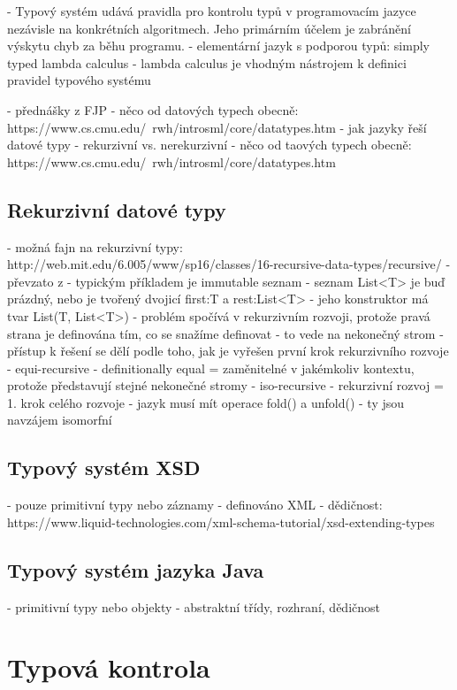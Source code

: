 \documentclass[czech,DP]{thesiskiv}
\begin{document}
- Typový systém udává pravidla pro kontrolu typů v programovacím jazyce nezávisle na konkrétních algoritmech. Jeho primárním účelem je zabránění výskytu chyb za běhu programu\cite{cardelli2004}.
- elementární jazyk s podporou typů: simply typed lambda calculus
- lambda calculus je vhodným nástrojem k definici pravidel typového systému

- přednášky z FJP
- něco od datových typech obecně: https://www.cs.cmu.edu/~rwh/introsml/core/datatypes.htm
- jak jazyky řeší datové typy
	- rekurzivní vs. nerekurzivní
- něco od taových typech obecně: https://www.cs.cmu.edu/~rwh/introsml/core/datatypes.htm

\subsection{Rekurzivní datové typy}

- možná fajn na rekurzivní typy: http://web.mit.edu/6.005/www/sp16/classes/16-recursive-data-types/recursive/
- převzato z \cite{pierce2002}
- typickým příkladem je immutable seznam
	- seznam List<T> je buď prázdný, nebo je tvořený dvojicí first:T a rest:List<T>
	- jeho konstruktor má tvar List(T, List<T>)
- problém spočívá v rekurzivním rozvoji, protože pravá strana je definována tím, co se snažíme definovat
- to vede na nekonečný strom
- přístup k řešení se dělí podle toho, jak je vyřešen první krok rekurzivního rozvoje
	- equi-recursive
		- definitionally equal = zaměnitelné v jakémkoliv kontextu, protože představují stejné nekonečné stromy
	- iso-recursive
		- rekurzivní rozvoj = 1. krok celého rozvoje
		- jazyk musí mít operace fold() a unfold()
		- ty jsou navzájem isomorfní

\subsection{Typový systém XSD}

 - pouze primitivní typy nebo záznamy
 - definováno XML
 - dědičnost: https://www.liquid-technologies.com/xml-schema-tutorial/xsd-extending-types

\subsection{Typový systém jazyka Java}

 - primitivní typy nebo objekty
 - abstraktní třídy, rozhraní, dědičnost

\section{Typová kontrola}
\end{document}

